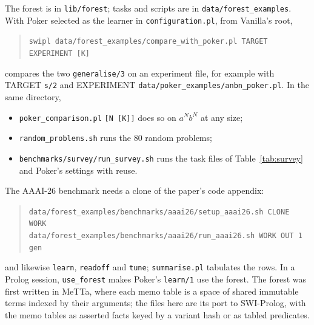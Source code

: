 \documentclass[11pt]{article}
\begin{document}
The forest is in \nolinkurl{lib/forest}; tasks and scripts are in
\nolinkurl{data/forest_examples}. With Poker selected as the learner in
\texttt{configuration.pl}, from Vanilla's root,
\begin{quote}\small
\texttt{swipl data/forest\_examples/compare\_with\_poker.pl TARGET EXPERIMENT [K]}
\end{quote}
compares the two \nolinkurl{generalise/3} on an experiment file, for example with
TARGET \nolinkurl{s/2} and EXPERIMENT \nolinkurl{data/poker_examples/anbn_poker.pl}.
In the same directory,
\begin{itemize}
\item \nolinkurl{poker_comparison.pl} \texttt{[N [K]]} does so on $a^Nb^N$ at any size;
\item \nolinkurl{random_problems.sh} runs the 80 random problems;
\item \nolinkurl{benchmarks/survey/run_survey.sh} runs the task files of
  Table~\ref{tab:survey} and Poker's settings with reuse.
\end{itemize}
The AAAI-26 benchmark needs a clone of the paper's code appendix:
\begin{quote}\small
\texttt{data/forest\_examples/benchmarks/aaai26/setup\_aaai26.sh CLONE WORK}\\
\texttt{data/forest\_examples/benchmarks/aaai26/run\_aaai26.sh WORK OUT 1 gen}
\end{quote}
and likewise \texttt{learn}, \texttt{readoff} and \texttt{tune}; \texttt{summarise.pl}
tabulates the rows. In a Prolog session, \texttt{use\_forest} makes Poker's
\nolinkurl{learn/1} use the forest. The forest was first written in MeTTa, where each
memo table is a space of shared immutable terms indexed by their arguments; the files
here are its port to SWI-Prolog, with the memo tables as asserted facts keyed by a
variant hash or as tabled predicates.
\end{document}
